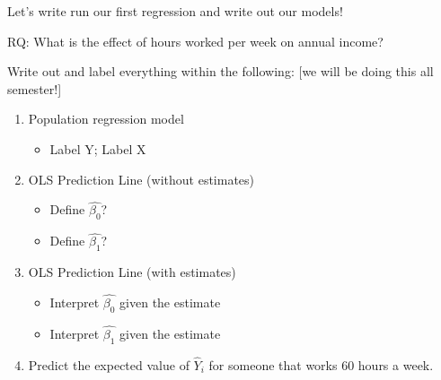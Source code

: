 \documentclass[
  8pt,
  ignorenonframetext,
  dvipsnames]{beamer}
\providecommand{\tightlist}{%
  \setlength{\itemsep}{0pt}\setlength{\parskip}{0pt}}
\let\olditem\item
\renewcommand{\item}{%
  \olditem\vspace{4pt}
}
\begin{document}
\begin{frame}{Let's write run our first regression and write out our
models!}
\protect\hypertarget{lets-write-run-our-first-regression-and-write-out-our-models-1}{}

RQ: What is the effect of hours worked per week on annual income?

\medskip

Write out and label everything within the following: {[}we will be doing
this all semester!{]}

\begin{enumerate}
\tightlist
\item
  Population regression model

  \begin{itemize}
  \tightlist
  \item
    Label Y; Label X
  \end{itemize}
\item
  OLS Prediction Line (without estimates)

  \begin{itemize}
  \tightlist
  \item
    Define \(\hat{\beta_0}\)?
  \item
    Define \(\hat{\beta_1}\)?
  \end{itemize}
\item
  OLS Prediction Line (with estimates)

  \begin{itemize}
  \tightlist
  \item
    Interpret \(\hat{\beta_0}\) given the estimate
  \item
    Interpret \(\hat{\beta_1}\) given the estimate
  \end{itemize}
\item
  Predict the expected value of \(\hat{Y}_i\) for someone that works 60
  hours a week.
\end{enumerate}

\end{frame}
\end{document}
